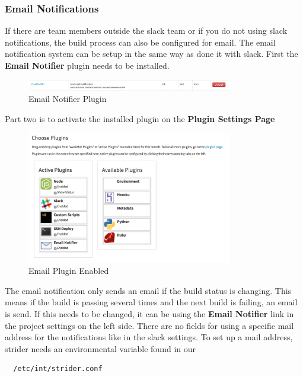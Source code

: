 \subsubsection{Email Notifications}
If there are team members outside the slack team or if you do not using slack notifications, the build process can also be configured
for email. The email notification system can be setup in the same way as done it with slack. First the \textbf{Email Notifier}
plugin needs to be installed.

\begin{figure}[h!]
  \centering
  \includegraphics[width=0.8\textwidth]{images/email_notifier.png}
  \caption{Email Notifier Plugin}
\end{figure}

Part two is to activate the installed plugin on the \textbf{Plugin Settings Page}

\begin{figure}[h!]
  \centering
  \includegraphics[width=0.8\textwidth]{images/email_active.png}
  \caption{Email Plugin Enabled}
\end{figure}

The email notification only sends an email if the build status is changing. This means if the build is passing several times and the next
build is failing, an email is send. If this needs to be changed, it can be using the \textbf{Email Notifier} link in the project settings on the left side.
There are no fields for using a specific mail address for the notifications like in the slack settings. To set up a mail address, strider needs an environmental
variable found in our

\begin{lstlisting}
  /etc/int/strider.conf
\end{lstlisting}

